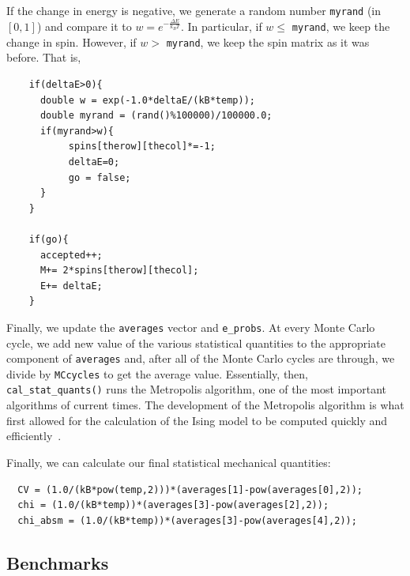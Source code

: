 \documentclass[12pt]{article}
\numberwithin{equation}{section}
\begin{document}
\par If the change in energy is negative, we generate a random number \texttt{myrand} (in $[0,1]$) and compare it to $w=e^{-\frac{\Delta E}{k_{B}T}}$.  In particular, if $w \leq$ \texttt{myrand}, we keep the change in spin.  However, if $w >$ \texttt{myrand}, we keep the spin matrix as it was before.  That is, 
\begin{verbatim}
    if(deltaE>0){
      double w = exp(-1.0*deltaE/(kB*temp));
      double myrand = (rand()%100000)/100000.0;  
      if(myrand>w){
           spins[therow][thecol]*=-1;
           deltaE=0;
           go = false;
      }
    }

    if(go){
      accepted++;
      M+= 2*spins[therow][thecol];
      E+= deltaE;
    }  
\end{verbatim}
\par Finally, we update the \texttt{averages} vector and \texttt{e\_probs}.  At every Monte Carlo cycle, we add new value of the various statistical quantities to the appropriate component of \texttt{averages} and, after all of the Monte Carlo cycles are through, we divide by \texttt{MCcycles} to get the average value.  Essentially, then, \texttt{cal\_stat\_quants()} runs the Metropolis algorithm, one of the most important algorithms of current times.  The development of the Metropolis algorithm is what first allowed for the calculation of the Ising model to be computed quickly and efficiently~\cite{lecture}.  
\par Finally, we can calculate our final statistical mechanical quantities:
\begin{verbatim}
  CV = (1.0/(kB*pow(temp,2)))*(averages[1]-pow(averages[0],2));
  chi = (1.0/(kB*temp))*(averages[3]-pow(averages[2],2));
  chi_absm = (1.0/(kB*temp))*(averages[3]-pow(averages[4],2));
\end{verbatim}

\subsection{Benchmarks}
\label{subsec:benchmarks}
\end{document}
